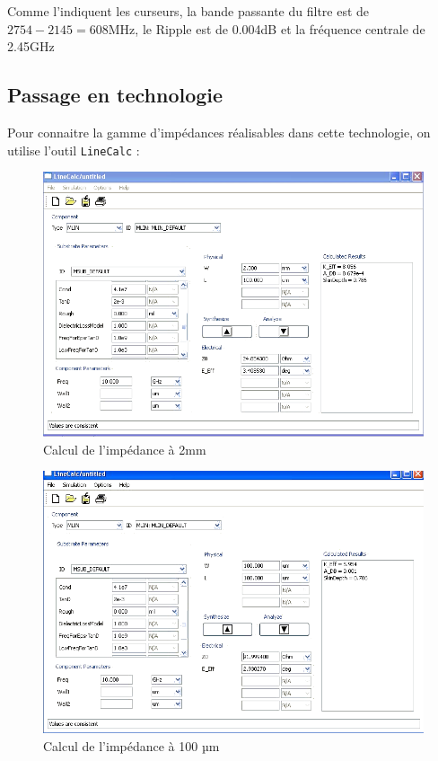 \documentclass[10pt]{article}
\begin{document}
Comme l’indiquent les curseurs, la bande passante du filtre est de $2754-2145=608$MHz, le Ripple est de 0.004dB et la fréquence centrale de 2.45GHz

\subsection{Passage en technologie}

Pour connaitre la gamme d’impédances réalisables dans cette technologie, on utilise l’outil \verb|LineCalc| :

\begin{figure}
    \begin{center}
        \includegraphics[width=15cm]{p20_2}
    \end{center}
    \caption{Calcul de l’impédance à 2mm}
\end{figure}
\begin{figure}
    \begin{center}
        \includegraphics[width=15cm]{p20_100}
    \end{center}
    \caption{Calcul de l’impédance à 100 µm}
\end{figure}
\end{document}
